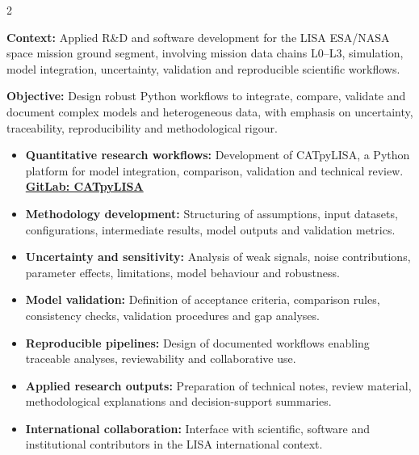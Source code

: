 \documentclass[8pt,a4paper,ragged2e,withhyper]{altacv}
\begin{document}
\begin{paracol}{2}
\divider


\textbf{Context:} Applied R\&D and software development for the LISA ESA/NASA space mission ground segment, involving mission data chains L0--L3, simulation, model integration, uncertainty, validation and reproducible scientific workflows.

\textbf{Objective:} Design robust Python workflows to integrate, compare, validate and document complex models and heterogeneous data, with emphasis on uncertainty, traceability, reproducibility and methodological rigour.

\begin{itemize}
  \item \textbf{Quantitative research workflows:} Development of CATpyLISA, a Python platform for model integration, comparison, validation and technical review.
  \textcolor{DarkPastelRed}{\href{https://gitlab.oca.eu/gboileau/lisa_l3_tools}{\bf GitLab: CATpyLISA}}
  \item \textbf{Methodology development:} Structuring of assumptions, input datasets, configurations, intermediate results, model outputs and validation metrics.
  \item \textbf{Uncertainty and sensitivity:} Analysis of weak signals, noise contributions, parameter effects, limitations, model behaviour and robustness.
  \item \textbf{Model validation:} Definition of acceptance criteria, comparison rules, consistency checks, validation procedures and gap analyses.
  \item \textbf{Reproducible pipelines:} Design of documented workflows enabling traceable analyses, reviewability and collaborative use.
  \item \textbf{Applied research outputs:} Preparation of technical notes, review material, methodological explanations and decision-support summaries.
  \item \textbf{International collaboration:} Interface with scientific, software and institutional contributors in the LISA international context.
\end{itemize}

\divider



\end{paracol}
\end{document}
